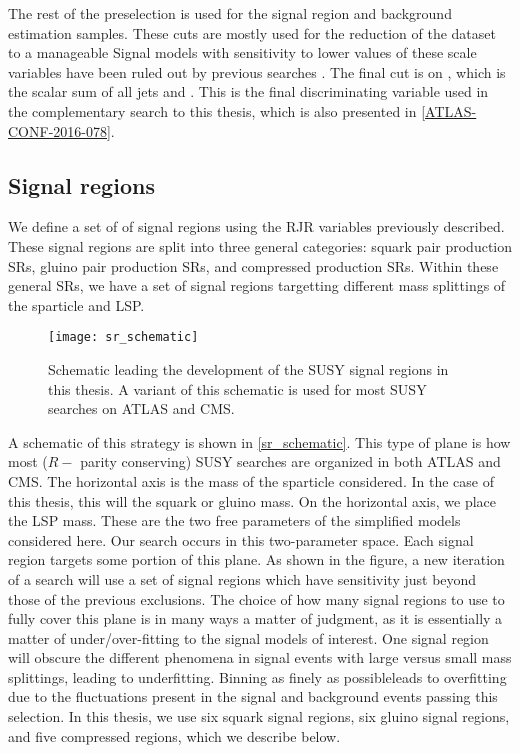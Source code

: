 The rest of the preselection is used for the signal region and background estimation samples.
These cuts are mostly used for the reduction of the dataset to a manageable
Signal models with sensitivity to lower values of these scale variables have been ruled out by previous searches .
The final cut is on \meff, which is the scalar sum of all jets and \met.
This is the final discriminating variable used in the complementary search to this thesis, which is also presented in \ref{ATLAS-CONF-2016-078}.



\subsection{Signal regions}
We define a set of of signal regions using the RJR variables previously described.
These signal regions are split into three general categories: squark pair production SRs, gluino pair production SRs, and compressed production SRs.
Within these general SRs, we have a set of signal regions targetting different mass splittings of the sparticle and LSP.
\begin{figure}
\caption{Schematic leading the development of the SUSY signal regions in this thesis.
A variant of this schematic is used for most SUSY searches on ATLAS and CMS.
} \label{fig:sr_schematic}
\texttt{[image: sr\_schematic]}
\end{figure}

A schematic of this strategy is shown in \ref{sr_schematic}.
This type of plane is how most ($R-$ parity conserving) SUSY searches are organized in both ATLAS and CMS.
The horizontal axis is the mass of the sparticle considered.
In the case of this thesis, this will the squark or gluino mass.
On the horizontal axis, we place the LSP mass.
These are the two free parameters of the simplified models considered here.
Our search occurs in this two-parameter space.
Each signal region targets some portion of this plane.
As shown in the figure, a new iteration of a search will use a set of signal regions which have sensitivity just beyond those of the previous exclusions.
The choice of how many signal regions to use to fully cover this plane is in many ways a matter of judgment, as it is essentially a matter of under/over-fitting to the signal models of interest.
One signal region will obscure the different phenomena in signal events with large versus small mass splittings, leading to underfitting.
Binning as finely as possible\footnotemark leads to overfitting due to the fluctuations present in the signal and background events passing this selection.
In this thesis, we use six squark signal regions, six gluino signal regions, and five compressed regions, which we describe below.

